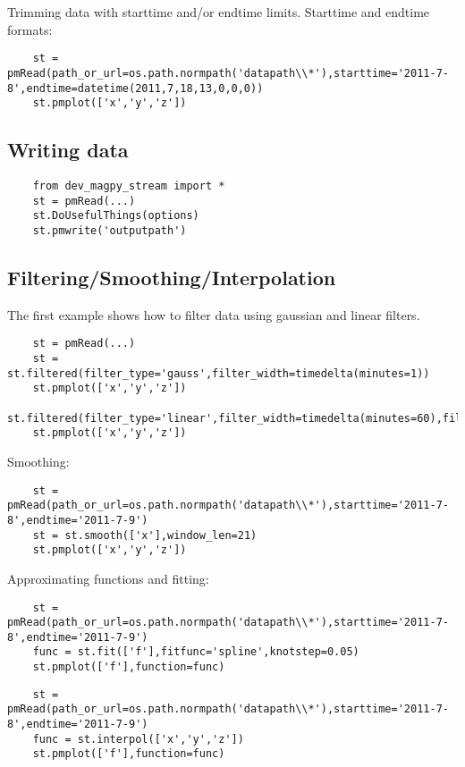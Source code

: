 Trimming data with starttime and/or endtime limits. Starttime and endtime formats:
\begin{verbatim}
    st = pmRead(path_or_url=os.path.normpath('datapath\\*'),starttime='2011-7-8',endtime=datetime(2011,7,18,13,0,0,0))
    st.pmplot(['x','y','z'])
\end{verbatim}

\subsection{Writing data}

\begin{verbatim}
    from dev_magpy_stream import *
    st = pmRead(...)
    st.DoUsefulThings(options)
    st.pmwrite('outputpath')
\end{verbatim}

\subsection{Filtering/Smoothing/Interpolation}

The first example shows how to filter data using gaussian and linear filters.
\begin{verbatim}
    st = pmRead(...)
    st = st.filtered(filter_type='gauss',filter_width=timedelta(minutes=1))
    st.pmplot(['x','y','z'])
    st.filtered(filter_type='linear',filter_width=timedelta(minutes=60),filter_offset=timedelta(minutes=30))
    st.pmplot(['x','y','z'])
\end{verbatim}

Smoothing:
\begin{verbatim}
    st = pmRead(path_or_url=os.path.normpath('datapath\\*'),starttime='2011-7-8',endtime='2011-7-9')
    st = st.smooth(['x'],window_len=21)
    st.pmplot(['x','y','z'])
\end{verbatim}

Approximating functions and fitting:
\begin{verbatim}
    st = pmRead(path_or_url=os.path.normpath('datapath\\*'),starttime='2011-7-8',endtime='2011-7-9')
    func = st.fit(['f'],fitfunc='spline',knotstep=0.05)
    st.pmplot(['f'],function=func)
\end{verbatim}

\begin{verbatim}
    st = pmRead(path_or_url=os.path.normpath('datapath\\*'),starttime='2011-7-8',endtime='2011-7-9')
    func = st.interpol(['x','y','z'])
    st.pmplot(['f'],function=func)
\end{verbatim}


